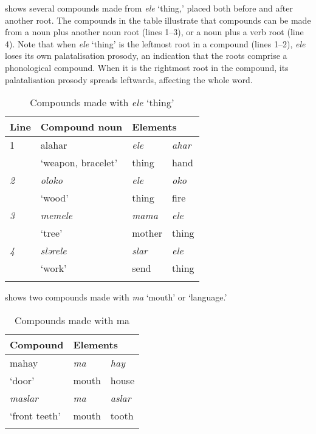  shows several compounds made from \textit{ele} ‘thing,’ placed both before and after another root. The compounds in the table illustrate that compounds can be made from a noun plus another noun root (lines 1--3), or a noun plus a verb root (line 4). Note that when \textit{ele} ‘thing’ is the leftmost root in a compound (lines 1--2), \textit{ele}  loses its own palatalisation prosody, an indication that the roots comprise a phonological compound. When it is the rightmost root in the compound, its palatalisation prosody spreads leftwards, affecting the whole word.

\begin{table}
\begin{tabular}{lll@{ }l}
\lsptoprule

{Line} & {Compound noun} & \multicolumn{2}{l}{Elements}\\\midrule
1 & alahar & \textit{ele} & \textit{ahar} \\
& ‘weapon, bracelet’ & thing & hand\\
\textit{2} & \textit{oloko} & \textit{ele} & \textit{oko}\\
& ‘wood’ & thing & fire\\
\textit{3} & \textit{memele} & \textit{mama} & \textit{ele} \\
& ‘tree’ & mother & thing\\
\textit{4} & \textit{slərele} & \textit{slar} & \textit{ele}\\
& ‘work’ & send & thing\\
\lspbottomrule
\end{tabular}
\caption{Compounds made with \textit{ele} ‘thing’}\label{tab:32}
\end{table}

 shows two compounds made with \textit{ma} ‘mouth’ or ‘language.’

\begin{table}
\begin{tabular}{ll@{ }l}
\lsptoprule
{Compound} & \multicolumn{2}{l}{Elements}\\\midrule
mahay & \textit{ma} & \textit{hay}\\
‘door’ & mouth & house\\\midrule
\textit{maslar } & \textit{ma} & \textit{aslar}\\ 
‘front teeth’  & mouth & tooth\\
\lspbottomrule
\end{tabular}
\caption{Compounds made with ma}\label{tab:33}
\end{table}
 
